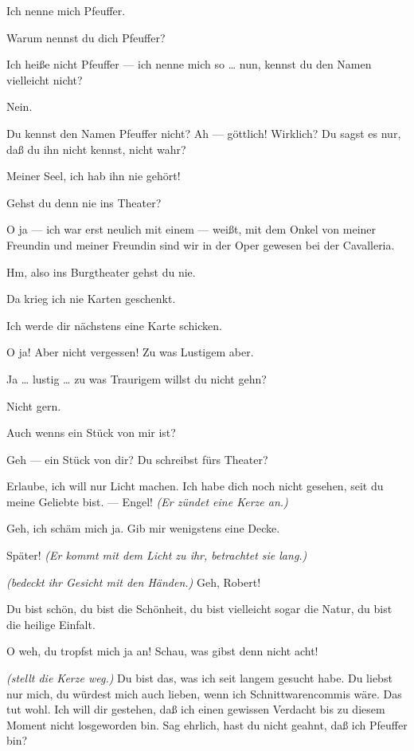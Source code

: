 \documentclass[
	final,
	a4paper,
	ngerman,
	mpinclude = true, %
	twoside = true,
	open = right,
	cleardoublepage = plain,
	DIV = 13,
	BCOR = 1cm,
	titlepage = firstiscover,
	]{scrbook}
\newcommand{\direction}[1]{\textit{(#1)}}
\newcommand{\thecharacter}[1]{\textup{\textsc{#1}}\xspace}
\newcommand{\thesuesse}{\thecharacter{Süßes Mädel}}
\newcommand{\thedichter}{\thecharacter{Dichter}}
\newcommand{\character}[1]{\item[#1:]}
\newcommand{\suesse}{\character{\thesuesse}}
\newcommand{\dichter}{\character{\thedichter}}
\begin{document}
\begin{play}
	\dichter
	Ich nenne mich Pfeuffer.

	\suesse
	Warum nennst du dich Pfeuffer?

	\dichter
	Ich heiße nicht Pfeuffer --- ich nenne mich so \ldots{} nun, kennst du den Namen vielleicht nicht?

	\suesse
	Nein.

	\dichter
	Du kennst den Namen Pfeuffer nicht? Ah --- göttlich! Wirklich? Du sagst es nur, daß du ihn nicht kennst, nicht wahr?

	\suesse
	Meiner Seel, ich hab ihn nie gehört!

	\dichter
	Gehst du denn nie ins Theater?

	\suesse
	O ja --- ich war erst neulich mit einem --- weißt, mit dem Onkel von meiner Freundin und meiner Freundin sind wir in der Oper gewesen bei der Cavalleria.

	\dichter
	Hm, also ins Burgtheater gehst du nie.

	\suesse
	Da krieg ich nie Karten geschenkt.

	\dichter
	Ich werde dir nächstens eine Karte schicken.

	\suesse
	O ja! Aber nicht vergessen! Zu was Lustigem aber.

	\dichter
	Ja \ldots{} lustig \ldots{} zu was Traurigem willst du nicht gehn?

	\suesse
	Nicht gern.

	\dichter
	Auch wenns ein Stück von mir ist?

	\suesse
	Geh --- ein Stück von dir? Du schreibst fürs Theater?

	\dichter
	Erlaube, ich will nur Licht machen. Ich habe dich noch nicht gesehen, seit du meine Geliebte bist. --- Engel! \direction{Er zündet eine Kerze an.}

	\suesse
	Geh, ich schäm mich ja. Gib mir wenigstens eine Decke.

	\dichter
	Später! \direction{Er kommt mit dem Licht zu ihr, betrachtet sie lang.}

	\suesse
	\direction{bedeckt ihr Gesicht mit den Händen.} Geh, Robert!

	\dichter
	Du bist schön, du bist die Schönheit, du bist vielleicht sogar die Natur, du bist die heilige Einfalt.

	\suesse
	O weh, du tropfst mich ja an! Schau, was gibst denn nicht acht!

	\dichter
	\direction{stellt die Kerze weg.} Du bist das, was ich seit langem gesucht habe. Du liebst nur mich, du würdest mich auch lieben, wenn ich Schnittwarencommis wäre. Das tut wohl. Ich will dir gestehen, daß ich einen gewissen Verdacht bis zu diesem Moment nicht losgeworden bin. Sag ehrlich, hast du nicht geahnt, daß ich Pfeuffer bin?


\end{play}
\end{document}

